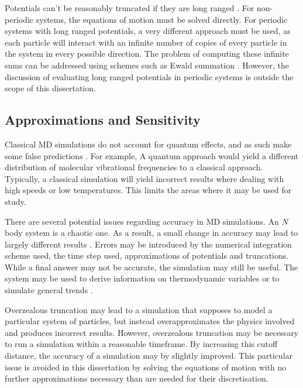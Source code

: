 %
Potentials can't be reasonably truncated if they are long ranged
\cite[p.~291]{frenkel2001understanding}.
%
For non-periodic systems, the equations of motion must be solved directly.
%
For periodic systems with long ranged potentials,
a very different approach must be used,
as each particle will interact with
an infinite number of copies of
every particle in the system in every possible direction.
%
The problem of computing these infinite sums can be addressed using
schemes such as Ewald summation
\cite{ewald1921berechnung}.
%
However, the discussion of evaluating long ranged potentials in periodic systems
is outside the scope of this dissertation.


\subsection{Approximations and Sensitivity}

Classical MD simulations do not account for quantum effects,
and as such make some false predictions
\cite[p.~390]{schlick2010molecular}.
%
For example, A quantum approach would yield
a different distribution of
molecular vibrational frequencies to a classical approach.
%
Typically, a classical simulation will yield incorrect results
where dealing with high speeds or low temperatures.
%
This limits the areas where it may be used for study.

There are several potential issues regarding accuracy in MD simulations.
%
An $N$ body system is a chaotic one.
%
As a result, a small change in accuracy may lead to
largely different results
\cite[p.~81]{frenkel2001understanding}.
%
Errors may be introduced by
the numerical integration scheme used,
the time step used,
approximations of potentials
and truncations.
%
While a final answer may not be accurate,
the simulation may still be useful.
%
The system may be used to derive information on
thermodynamic variables or to simulate general trends
\cite[p.~399]{schlick2010molecular}.

Overzealous truncation may lead to a simulation that supposes to
model a particular system of particles, but instead overapproximates
the physics involved and produces incorrect results.
%
However, overzealous truncation may be necessary to run a simulation
within a reasonable timeframe.
%
By increasing this cutoff distance, the accuracy of a simulation may
by slightly improved.
%
This particular issue is avoided in this dissertation by solving the
equations of motion with no further approximations necessary than
are needed for their discretisation.
